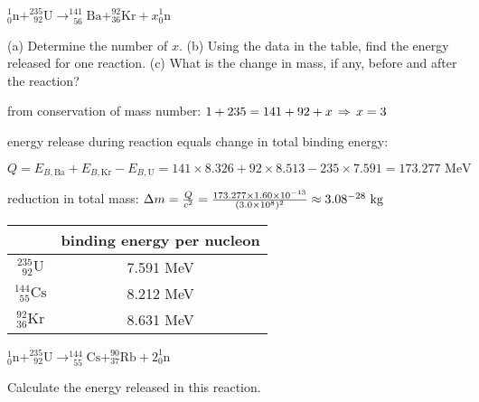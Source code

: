 {

\centering

$^1_0\text{n} + ^{235}_{\phantom{2}92}\text{U} \longrightarrow ^{141}_{\phantom{1}56}\text{Ba} + ^{92}_{36}\text{Kr} + x^1_0\text{n}$

}

\noindent (a) Determine the number of $x$. (b) Using the data in the table, find the energy released for one reaction. (c) What is the change in mass, if any, before and after the reaction?

\begin{soln} from conservation of mass number: $1+235=141+92+x \, \Rightarrow \, x=3$

energy release during reaction equals change in total binding energy:

{

\centering

$Q=E_{B,\text{Ba}} + E_{B,\text{Kr}} - E_{B,\text{U}} = 141\times8.326+92\times8.513-235\times7.591=173.277 \text{ MeV} $

}

reduction in total mass: $\Delta m = \frac{Q}{c^2} = \frac{173.277\times1.60\times10^{-13}}{(3.0\times10^8)^2} \approx 3.08\time10^{-28} \text{ kg}$ \end{soln}


\begin{marginfigure}
	\flushright
	\begin{tabular}{|c|c|}
		\hline
		& binding energy per nucleon \\ \hline
		\rule[-1em]{0pt}{3em}$^{235}_{\phantom{2}92}\text{U}$ & 7.591 MeV \\ \hline \rule[-1em]{0pt}{3em}$^{144}_{\phantom{1}55}\text{Cs}$ & 8.212 MeV\\ \hline \rule[-1em]{0pt}{3em}$^{92}_{36}\text{Kr}$ & 8.631 MeV\\ \hline
	\end{tabular}
\end{marginfigure}


{
	
	\centering
	
	$^1_0\text{n} + ^{235}_{\phantom{2}92}\text{U} \longrightarrow ^{144}_{\phantom{1}55}\text{Cs} + ^{90}_{37}\text{Rb} + 2^1_0\text{n}$	
	
}

\noindent Calculate the energy released in this reaction.


